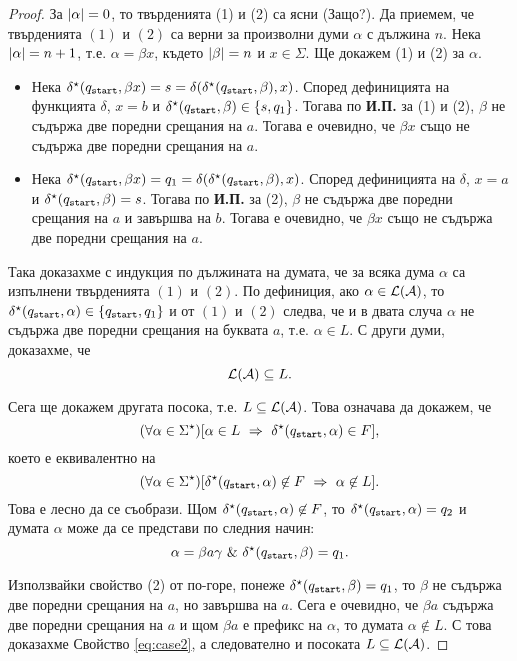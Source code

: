 \begin{proof}
 За $\lvert{\alpha}\rvert = 0$, то твърденията (1) и (2) са ясни (Защо?).
 Да приемем, че твърденията $(1)$ и $(2)$ са верни за произволни думи $\alpha$ с дължина $n$.
 Нека $\lvert{\alpha}\rvert = n+1$, т.е. $\alpha = \beta x$, където $\lvert{\beta}\rvert = n$ и $x \in \Sigma$.
 Ще докажем (1) и (2) за $\alpha$.
 \begin{itemize}[-]
 \item 
   Нека $\delta^\star(q_{\texttt{start}},\beta x) = s = \delta(\delta^\star(q_{\texttt{start}},\beta),x)$.
   Според дефиницията на функцията $\delta$, $x = b$ и $\delta^\star(q_{\texttt{start}},\beta) \in \{s,q_1\}$.
   Тогава по {\bf И.П.} за (1) и (2), $\beta$ не съдържа две поредни срещания на $a$.
   Тогава е очевидно, че $\beta x$ също не съдържа две поредни срещания на $a$.
 \item
   Нека $\delta^\star(q_{\texttt{start}},\beta x) = q_1 = \delta(\delta^\star(q_{\texttt{start}},\beta),x)$.
   Според дефиницията на $\delta$, $x = a$ и $\delta^\star(q_{\texttt{start}},\beta) = s$.
   Тогава по {\bf И.П.} за (2), $\beta$ не съдържа две поредни срещания на $a$
   и завършва на $b$.
   Тогава е очевидно, че $\beta x$ също не съдържа две поредни срещания на $a$.
 \end{itemize}
 
 Така доказахме с индукция по дължината на думата, че за всяка дума $\alpha$
 са  изпълнени твърденията $(1)$ и $(2)$. По дефиниция, ако $\alpha \in \mathcal{L}(\mathcal{A})$,
 то $\delta^\star(q_{\texttt{start}},\alpha) \in \{q_{\texttt{start}},q_1\}$ и от $(1)$ и $(2)$ следва, че и в двата случа
 $\alpha$ не съдържа две поредни срещания на буквата $a$, т.е. $\alpha \in L$.
 С други думи, доказахме, че 
 \[\mathcal{L}(\mathcal{A}) \subseteq L.\]

 Сега ще докажем другата посока, т.е. $L \subseteq \mathcal{L}(\mathcal{A})$.
 Това означава да докажем, че
 \[(\forall \alpha \in \Sigma^\star)[\alpha \in L\ \Rightarrow\ \delta^\star(\qstart,\alpha) \in F],\]
 което е еквивалентно на
 \begin{equation}
   \label{eq:case2}
   (\forall \alpha \in \Sigma^\star)[\delta^\star(q_{\texttt{start}},\alpha) \not\in F \ \Rightarrow\ \alpha\not\in L].
 \end{equation}
 Това е лесно да се съобрази.
 Щом $\delta^\star(q_{\texttt{start}},\alpha) \not\in F$, то 
 $\delta^\star(q_{\texttt{start}},\alpha) = q_2$ и думата $\alpha$ може да се представи по следния начин:
 \[\alpha = \beta a \gamma\ \&\ \delta^\star(\qstart,\beta) = q_1.\]
 
 Използвайки свойство (2) от по-горе, понеже $\delta^\star(q_{\texttt{start}},\beta) = q_1$, то
 $\beta$ не съдържа две поредни срещания на $a$, но завършва на $a$.
 Сега е очевидно, че $\beta a$ съдържа две поредни срещания на $a$ и 
 щом $\beta a$ е префикс на $\alpha$, то думата $\alpha \not\in L$.
 С това доказахме Свойство \ref{eq:case2}, а следователно и посоката $L\subseteq \mathcal{L}(\mathcal{A})$.
\end{proof}

